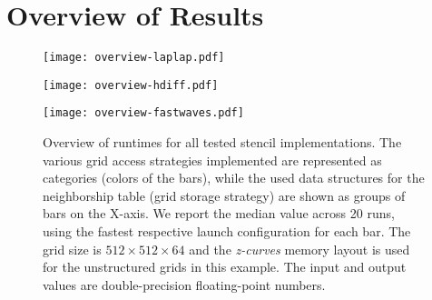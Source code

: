 \section{Overview of Results}

\begin{figure}
	\begin{center}
	    \texttt{[image: overview-laplap.pdf]}
    
	    \vspace{0.5cm}
    
	    \texttt{[image: overview-hdiff.pdf]}
    
	    \vspace{0.5cm}
    
	    \texttt{[image: overview-fastwaves.pdf]}
		
    \end{center}
    \caption{\label{fig:storage-access} Overview of runtimes for all tested stencil implementations. The various grid access strategies implemented are represented as categories (colors of the bars), while the used data structures for the neighborship table (grid storage strategy) are shown as groups of bars on the X-axis. We report the median value across 20 runs, using the fastest respective launch configuration for each bar. The grid size is $512\times 512\times 64$ and the \emph{z-curves} memory layout is used for the unstructured grids in this example. The input and output values are double-precision floating-point numbers.}
\end{figure}

